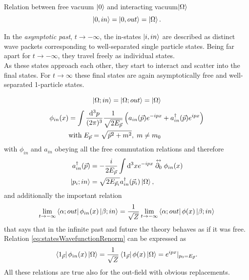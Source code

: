 \begin{mybox}{Relation between free vacuum $\ket{0}$ and interacting vacuum$\ket{\Omega}$}
		\begin{equation}
			\ket{0,in}=\ket{0,out} = \ket{\Omega}.
		\end{equation}
\end{mybox}
In the \emph{asymptotic past}, $t\rightarrow-\infty$, the in-states $\ket{i, in}$ are described as distinct wave packets corresponding to well-separated single particle states. Being far apart for $t\rightarrow-\infty$, they travel freely as individual states.\\
As these states approach each other, they start to interact and scatter into the final states. For $t\rightarrow\infty$ these final states are again asymptotically free and well-separated 1-particle states.
\begin{mybox}{}
	\begin{equation}
		\ket{\Omega;in} = \ket{\Omega;out} = \ket{\Omega}
	\end{equation}
	\begin{align}
		\phi_{in}(x) &= \int \frac{\mathrm{d}^3 p}{(2 \pi)^3} \frac{1}{\sqrt{2 E_{\vec{p}}}} \left(a_{in}(\vec{p}) e^{-ipx} +a^\dagger_{in}(\vec{p}) e^{ipx}\right) \\
		& \mathrm{with}\; E_{\vec{p}}=\sqrt{\vec{p}^2 +m^2},\; m\neq m_0\nonumber
	\end{align}
	with $\phi_{in}$ and $a_{in}$ obeying all the free commutation relations and therefore
	\begin{align}
		a^\dagger_{in}(\vec{p}) &= -\frac{i}{2 E_{\vec{p}}} \int \mathrm{d}^3 x e^{-ipx} \stackrel{\leftrightarrow}{\partial_0} \phi_{in}(x)\\
		\ket{p_i;in} &= \sqrt{2 E_{\vec{p}_i}} a^\dagger_{in} (\vec{p}_i)\ket{\Omega},
	\end{align}
and additionally the important relation
\begin{equation}
	\lim_{t\rightarrow-\infty} \bra{\alpha;out}\phi_{in}(x) \ket{\beta; in} = \frac{1}{\sqrt{Z}} \lim_{t\rightarrow-\infty} \bra{\alpha;out}\phi(x) \ket{\beta;in}
\end{equation}
that says that in the infinite past and future the theory behaves as if it was free. Relation \ref{eq:statesWavefunctionRenorm} can be expressed as
\begin{equation}
\bra{1_{\vec{p}}}\phi_{in}(x) \ket{\Omega} = \frac{1}{\sqrt{Z}} \bra{1_{\vec{p}}} \phi(x) \ket{\Omega} = e^{ipx}|_{p_0=E_{\vec{p}}}.
\end{equation}
All these relations are true also for the out-field with obvious replacements.
\end{mybox}
